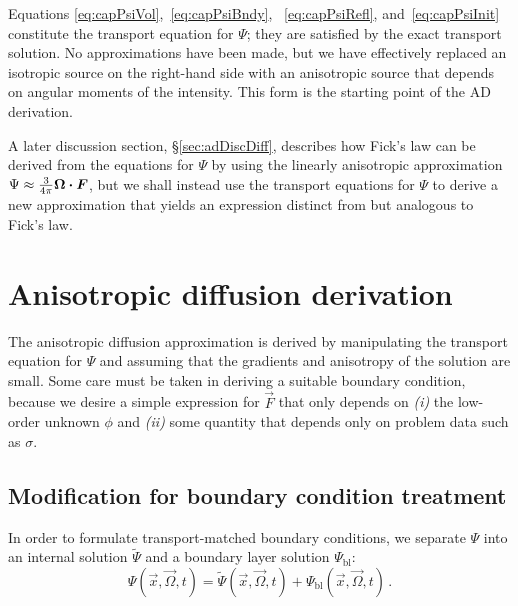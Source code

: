 Equations \eqref{eq:capPsiVol},~\eqref{eq:capPsiBndy},%
~\eqref{eq:capPsiRefl}, and~\eqref{eq:capPsiInit} constitute the transport
equation for $\Psi$; they are satisfied by the exact transport solution. No
approximations have been made, but we have effectively replaced an isotropic
source on the right-hand side with an anisotropic source that depends on
angular moments of the intensity. This form is the starting point of the AD
derivation.

A later discussion section, \S\ref{sec:adDiscDiff}, describes how Fick's law can
be derived from the equations for $\Psi$
by using the linearly anisotropic approximation \mbox{$\Psi\approx \frac{3}{4\pi}
\bm{\Omega}\bm{\cdot}\bm{F}$}, but we shall instead use the transport
equations for $\Psi$ to
derive a new approximation that yields an expression distinct from but 
analogous to Fick's law.

\section{Anisotropic diffusion derivation}
The anisotropic diffusion approximation is derived by manipulating the
transport equation for $\Psi$ and assuming that the gradients and anisotropy
of the solution are small. Some care must be taken in deriving
a suitable boundary condition, because we desire a simple expression for
$\vec{F}$ that only depends on \textsl{(i)} the low-order unknown $\phi$ and
\textsl{(ii)} some quantity that depends only
on problem data such as $\sigma$.

\subsection{Modification for boundary condition treatment}
In order to formulate transport-matched boundary conditions, we separate $\Psi$
into an internal solution $\tilde\Psi$ and a boundary layer solution
$\Psi_\mathrm{bl}$:
\begin{equation} \label{eq:boundaryLayerPsi}
  \Psi(\vec{x}, \vec{\Omega}, t)
  = \tilde\Psi(\vec{x}, \vec{\Omega}, t)
  + \Psi_\mathrm{bl}(\vec{x}, \vec{\Omega}, t)\,.
\end{equation}


